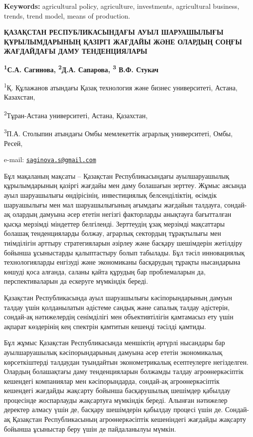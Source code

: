 {\bfseries Keywords:} agricultural policy, agriculture, investments,
agricultural business, trends, trend model, means of production.

{\bfseries ҚАЗАҚСТАН РЕСПУБЛИКАСЫНДАҒЫ АУЫЛ ШАРУАШЫЛЫҒЫ ҚҰРЫЛЫМДАРЫНЫҢ
ҚАЗІРГІ ЖАҒДАЙЫ ЖӘНЕ ОЛАРДЫҢ СОҢҒЫ ЖАҒДАЙДАҒЫ ДАМУ ТЕНДЕНЦИЯЛАРЫ}

{\bfseries \textsuperscript{1}С.А. Сагинова\textsuperscript{\envelope },
\textsuperscript{2}Д.А. Сапарова, \textsuperscript{3} В.Ф. Стукач}

\textsuperscript{1}Қ. Құлажанов атындағы Қазақ технология және бизнес
университеті, Астана, Казахстан,

\textsuperscript{2}Тұран-Астана университеті, Астана, Қазахстан,

\textsuperscript{3}П.А. Столыпин атындағы Омбы мемлекеттік аграрлық
университеті, Омбы, Ресей,

e-mail:
\href{mailto:saginova.s@gmail.com}{\nolinkurl{saginova.s@gmail.com}}

Бұл мақаланың мақсаты -- Қазақстан Республикасындағы ауылшаруашылық
құрылымдарының қазіргі жағдайы мен даму болашағын зерттеу. Жұмыс аясында
ауыл шаруашылығы өндірісінің, инвестициялық белсенділіктің, өсімдік
шаруашылығы мен мал шаруашылығының ағымдағы жағдайын талдауға, сондай-ақ
олардың дамуына әсер ететін негізгі факторларды анықтауға бағытталған
қысқа мерзімді міндеттер белгіленді. Зерттеудің ұзақ мерзімді мақсаттары
болашақ тенденцияларды болжау, аграрлық сектордың тұрақтылығы мен
тиімділігін арттыру стратегияларын әзірлеу және басқару шешімдерін
жетілдіру бойынша ұсыныстарды қалыптастыру болып табылады. Бұл тәсіл
инновациялық технологияларды енгізуді және экономиканы басқарудың
тұрақты нысандарына көшуді қоса алғанда, саланы қайта құрудың бар
проблемаларын да, перспективаларын да ескеруге мүмкіндік береді.

Қазақстан Республикасында ауыл шаруашылығы кәсіпорындарының дамуын
талдау үшін қолданылатын әдістеме сандық және сапалық талдау әдістерін,
сондай-ақ нәтижелердің сенімділігі мен объективтілігін қамтамасыз ету
үшін ақпарат көздерінің кең спектрін қамтитын кешенді тәсілді қамтиды.

Бұл жұмыс Қазақстан Республикасында меншіктің әртүрлі нысандары бар
ауылшаруашылық кәсіпорындарының дамуына әсер ететін экономикалық
көрсеткіштерді талдаудан туындайтын эконометрикалық есептеулерге
негізделген. Олардың болашақтағы даму тенденцияларын болжамды талдау
агроөнеркәсіптік кешендегі компаниялар мен кәсіпорындарда, сондай-ақ
агроөнеркәсіптік кешендегі жағдайды жақсарту бойынша басқарушылық
шешімдер қабылдау процесінде жоспарлауды жақсартуға мүмкіндік береді.
Алынған нәтижелер деректер алмасу үшін де, басқару шешімдерін қабылдау
процесі үшін де. Сондай-ақ Қазақстан Республикасының агроөнеркәсіптік
кешеніндегі жағдайды жақсарту бойынша ұсыныстар беру үшін де
пайдаланылуы мүмкін.

